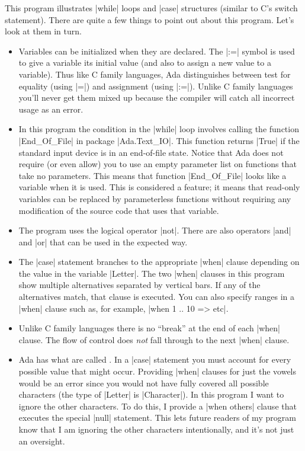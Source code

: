 This program illustrates |while| loops and |case| structures (similar to C's switch statement).
There are quite a few things to point out about this program. Let's look at them in turn.

\begin{itemize}
\item Variables can be initialized when they are declared. The |:=| symbol is used to give a
  variable its initial value (and also to assign a new value to a variable). Thus like C family
  languages, Ada distinguishes between test for equality (using |=|) and assignment (using
  |:=|). Unlike C family languages you'll never get them mixed up because the compiler will
  catch all incorrect usage as an error.

\item In this program the condition in the |while| loop involves calling the function
  |End_Of_File| in package |Ada.Text_IO|. This function returns |True| if the standard input
  device is in an end-of-file state. Notice that Ada does not require (or even allow) you to use
  an empty parameter list on functions that take no parameters. This means that function
  |End_Of_File| looks like a variable when it is used. This is considered a feature; it means
  that read-only variables can be replaced by parameterless functions without requiring any
  modification of the source code that uses that variable.

\item The program uses the logical operator |not|. There are also operators |and| and |or| that
  can be used in the expected way.

\item The |case| statement branches to the appropriate |when| clause depending on the value in
  the variable |Letter|. The two |when| clauses in this program show multiple alternatives
  separated by vertical bars. If any of the alternatives match, that clause is executed. You can
  also specify ranges in a |when| clause such as, for example, |when 1 .. 10 => etc|.

\item Unlike C family languages there is no ``break'' at the end of each |when| clause. The flow
  of control does \emph{not} fall through to the next |when| clause.

\item Ada has what are called . In a |case| statement you must
  account for every possible value that might occur. Providing |when| clauses for just the
  vowels would be an error since you would not have fully covered all possible characters (the
  type of |Letter| is |Character|). In this program I want to ignore the other characters. To do
  this, I provide a |when others| clause that executes the special |null| statement. This lets
  future readers of my program know that I am ignoring the other characters intentionally, and
  it's not just an oversight.


\end{itemize}
